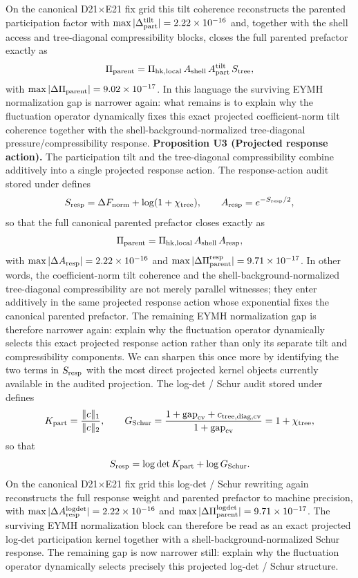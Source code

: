 \documentclass[aps,prd,onecolumn,notitlepage,nofootinbib,superscriptaddress,11pt,floatfix]{revtex4-2}
\begin{document}
On the canonical D21$\times$E21 fix grid this tilt coherence reconstructs the parented participation factor with $\max|\Delta_{\rm part}^{\rm tilt}|=2.22\times10^{-16}$ and, together with the shell access and tree-diagonal compressibility blocks, closes the full parented prefactor exactly as
\[
\Pi_{\rm parent}
=\Pi_{\rm hk,local}\,
A_{\rm shell}\,
A_{\rm part}^{\rm tilt}\,
S_{\rm tree},
\]
with $\max|\Delta\Pi_{\rm parent}|=9.02\times10^{-17}$. In this language the surviving EYMH normalization gap is narrower again: what remains is to explain why the fluctuation operator dynamically fixes this exact projected coefficient-norm tilt coherence together with the shell-background-normalized tree-diagonal pressure/compressibility response.
\medskip\noindent\textbf{Proposition U3 (Projected response action).}
The participation tilt and the tree-diagonal compressibility combine additively into a single projected response action. The response-action audit stored under  defines
\[
S_{\rm resp}=\Delta F_{\rm norm}+\log(1+\chi_{\rm tree}),
\qquad
A_{\rm resp}=e^{-S_{\rm resp}/2},
\]
so that the full canonical parented prefactor closes exactly as
\[
\Pi_{\rm parent}
=\Pi_{\rm hk,local}\,
A_{\rm shell}\,
A_{\rm resp},
\]
with $\max|\Delta A_{\rm resp}|=2.22\times10^{-16}$ and $\max|\Delta\Pi_{\rm parent}^{\rm resp}|=9.71\times10^{-17}$. In other words, the coefficient-norm tilt coherence and the shell-background-normalized tree-diagonal compressibility are not merely parallel witnesses; they enter additively in the same projected response action whose exponential fixes the canonical parented prefactor. The remaining EYMH normalization gap is therefore narrower again: explain why the fluctuation operator dynamically selects this exact projected response action rather than only its separate tilt and compressibility components.
We can sharpen this once more by identifying the two terms in $S_{\rm resp}$ with the most direct projected kernel objects currently available in the audited projection. The log-det / Schur audit stored under  defines
\[
K_{\rm part}=\frac{\|c\|_1}{\|c\|_2},
\qquad
G_{\rm Schur}=\frac{1+\mathrm{gap}_{\rm cv}+c_{{\rm tree},{\rm diag},{\rm cv}}}{1+\mathrm{gap}_{\rm cv}}=1+\chi_{\rm tree},
\]
so that
\[
S_{\rm resp}=\log\det K_{\rm part}+\log G_{\rm Schur}.
\]
On the canonical D21$\times$E21 fix grid this log-det / Schur rewriting again reconstructs the full response weight and parented prefactor to machine precision, with $\max|\Delta A_{\rm resp}^{\rm logdet}|=2.22\times10^{-16}$ and $\max|\Delta\Pi_{\rm parent}^{\rm logdet}|=9.71\times10^{-17}$. The surviving EYMH normalization block can therefore be read as an exact projected log-det participation kernel together with a shell-background-normalized Schur response. The remaining gap is now narrower still: explain why the fluctuation operator dynamically selects precisely this projected log-det / Schur structure.
\end{document}
